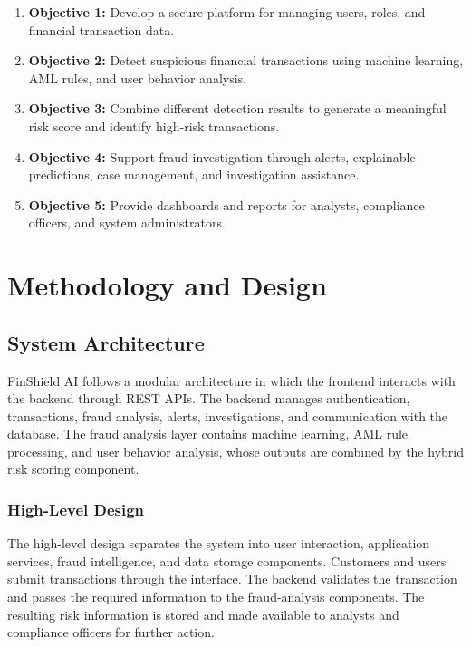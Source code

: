 \documentclass{tietreport}
\begin{document}
\begin{enumerate}
  \item \textbf{Objective 1:} Develop a secure platform for managing users,
    roles, and financial transaction data.
  \item \textbf{Objective 2:} Detect suspicious financial transactions using
    machine learning, AML rules, and user behavior analysis.
  \item \textbf{Objective 3:} Combine different detection results to generate
    a meaningful risk score and identify high-risk transactions.
  \item \textbf{Objective 4:} Support fraud investigation through alerts,
    explainable predictions, case management, and investigation assistance.
  \item \textbf{Objective 5:} Provide dashboards and reports for analysts,
    compliance officers, and system administrators.
\end{enumerate}


\chapter{Methodology and Design}

\section{System Architecture}

FinShield AI follows a modular architecture in which the frontend interacts
with the backend through REST APIs. The backend manages authentication,
transactions, fraud analysis, alerts, investigations, and communication with
the database. The fraud analysis layer contains machine learning, AML rule
processing, and user behavior analysis, whose outputs are combined by the
hybrid risk scoring component.

\subsection{High-Level Design}

The high-level design separates the system into user interaction,
application services, fraud intelligence, and data storage components.
Customers and users submit transactions through the interface. The backend
validates the transaction and passes the required information to the
fraud-analysis components. The resulting risk information is stored and
made available to analysts and compliance officers for further action.
\end{document}
